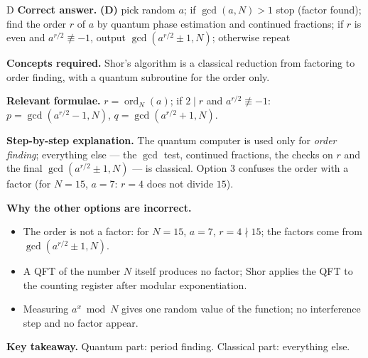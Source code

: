\documentclass[11pt,a4paper]{article}
\newcommand{\qsep}{\par\vspace{2pt}{\color{black!15}\hrule}\vspace{4pt}}
\begin{document}
\begin{solbox}{D}
\textbf{\color{brand}Correct answer.} \textcolor{okgreen}{\textbf{(D)}} pick random $a$; if $\gcd(a, N) > 1$ stop (factor found); find the order $r$ of $a$ by quantum phase estimation and continued fractions; if $r$ is even and $a^{r/2} \not\equiv -1$, output $\gcd(a^{r/2} \pm 1, N)$; otherwise repeat

\textbf{\color{brand}Concepts required.} Shor's algorithm is a classical reduction from factoring to order finding, with a quantum subroutine for the order only.

\textbf{\color{brand}Relevant formulae.} $r = \operatorname{ord}_N(a)$; if $2 \mid r$ and $a^{r/2} \not\equiv -1$: $p = \gcd(a^{r/2} - 1, N)$, $q = \gcd(a^{r/2} + 1, N)$.

\textbf{\color{brand}Step-by-step explanation.} The quantum computer is used only for \emph{order finding}; everything else --- the $\gcd$ test, continued fractions, the checks on $r$ and the
final $\gcd(a^{r/2} \pm 1, N)$ --- is classical. Option 3 confuses the order with a factor (for $N = 15$, $a = 7$: $r = 4$ does not divide $15$).

\textbf{\color{brand}Why the other options are incorrect.}
\begin{itemize}[leftmargin=2.4em, itemsep=1pt, topsep=2pt]
\item[\textbf{(A)}] The order is not a factor: for $N = 15$, $a = 7$, $r = 4 \nmid 15$; the factors come from $\gcd(a^{r/2} \pm 1, N)$.
\item[\textbf{(B)}] A QFT of the number $N$ itself produces no factor; Shor applies the QFT to the counting register after modular exponentiation.
\item[\textbf{(C)}] Measuring $a^x \bmod N$ gives one random value of the function; no interference step and no factor appear.
\end{itemize}
\textbf{\color{brand}Key takeaway.} Quantum part: period finding. Classical part: everything else.
\end{solbox}
\qsep
\end{document}

